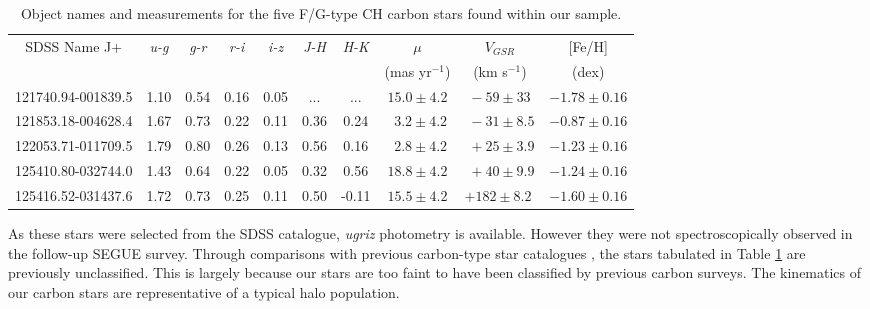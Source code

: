 \documentclass{emulateapj}
\begin{document}
	\begin{table}[t]
	\centering
	{\hfill{}
		\begin{tabular}{c c c c c c c c c c}
		\toprule
		\multirow{2}{*}{SDSS Name J+\tablenotemark{a}}	&\multirow{2}{*}{\textit{u-g}}	& \multirow{2}{*}{\textit{g-r}}	& \multirow{2}{*}{\textit{r-i}} & \multirow{2}{*}{\textit{i-z}} & \multirow{2}{*}{\textit{J-H}} & \multirow{2}{*}{\textit{H-K}} & $\mu$ & $V_{GSR}$		& [Fe/H]	\\
									&		 	&		  	&			&			&			& &	(mas yr$^{-1}$)       	&(km s$^{-1}$)		& (dex)	\\ 
		\toprule
		121740.94-001839.5				& 1.10		& 0.54		& 0.16 		& 0.05		& ...\tablenotemark{b}& ...\tablenotemark{b}	& $15.0 \pm 4.2$ & $\:-59 \pm 33\;$	& $-1.78 \pm 0.16$ \\
		121853.18-004628.4				& 1.67		& 0.73 		& 0.22		& 0.11		& 0.36		& 0.24		& $\:\:3.2 \pm 4.2$ & $\:-31 \pm 8.5$	& $-0.87 \pm 0.16$ \\
		122053.71-011709.5  				& 1.79		& 0.80		& 0.26		& 0.13		& 0.56		& 0.16		& $\:\:2.8 \pm 4.2$ & $\:+25 \pm 3.9$	& $-1.23 \pm 0.16$ \\
		125410.80-032744.0				& 1.43		& 0.64		& 0.22		& 0.05		& 0.32		& 0.56		& $18.8 \pm 4.2$ & $\:+40 \pm 9.9$	& $-1.24 \pm 0.16$ \\	
		125416.52-031437.6				& 1.72		& 0.73		& 0.25		& 0.11		& 0.50		& -0.11\:	 	& $15.5 \pm 4.2$ & $+182 \pm 8.2\;$	& $-1.60 \pm 0.16$ \\
		
		\bottomrule
		\end{tabular}
		
	
	}
	\hfill{}
	\caption{Object names and measurements for the five F/G-type CH carbon stars found within our sample.}
	\label{tb:carbon-stars}

	\end{table}
	

	As these stars were selected from the SDSS catalogue, \textit{ugriz} photometry is available. However they were not spectroscopically observed in the follow-up SEGUE survey. Through comparisons with previous carbon-type star catalogues \citep{Totten;Irwin_1998, Downes;et-al_2004, Goswami;et-al_2010}, the stars tabulated in Table \ref{tb:carbon-stars} are previously unclassified. This is largely because our stars are too faint to have been classified by previous carbon surveys. The kinematics of our carbon stars are representative of a typical halo population.
\end{document}
